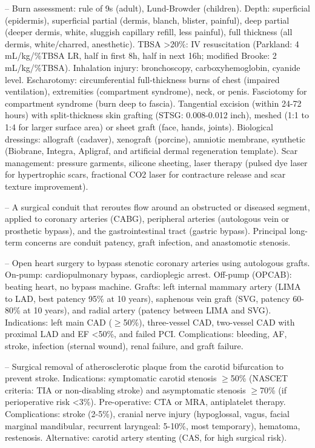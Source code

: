 -- Burn assessment: rule of 9s (adult), Lund-Browder (children). Depth: superficial (epidermis), superficial partial (dermis, blanch, blister, painful), deep partial (deeper dermis, white, sluggish capillary refill, less painful), full thickness (all dermis, white/charred, anesthetic). TBSA >20\%: IV resuscitation (Parkland: 4 mL/kg/\%TBSA LR, half in first 8h, half in next 16h; modified Brooke: 2 mL/kg/\%TBSA). Inhalation injury: bronchoscopy, carboxyhemoglobin, cyanide level. Escharotomy: circumferential full-thickness burns of chest (impaired ventilation), extremities (compartment syndrome), neck, or penis. Fasciotomy for compartment syndrome (burn deep to fascia). Tangential excision (within 24-72 hours) with split-thickness skin grafting (STSG: 0.008-0.012 inch), meshed (1:1 to 1:4 for larger surface area) or sheet graft (face, hands, joints). Biological dressings: allograft (cadaver), xenograft (porcine), amniotic membrane, synthetic (Biobrane, Integra, Apligraf, and artificial dermal regeneration template). Scar management: pressure garments, silicone sheeting, laser therapy (pulsed dye laser for hypertrophic scars, fractional CO2 laser for contracture release and scar texture improvement).

-- A surgical conduit that reroutes flow around an obstructed or diseased segment, applied to coronary arteries (CABG), peripheral arteries (autologous vein or prosthetic bypass), and the gastrointestinal tract (gastric bypass). Principal long-term concerns are conduit patency, graft infection, and anastomotic stenosis.

-- Open heart surgery to bypass stenotic coronary arteries using autologous grafts. On-pump: cardiopulmonary bypass, cardioplegic arrest. Off-pump (OPCAB): beating heart, no bypass machine. Grafts: left internal mammary artery (LIMA to LAD, best patency 95\% at 10 years), saphenous vein graft (SVG, patency 60-80\% at 10 years), and radial artery (patency between LIMA and SVG). Indications: left main CAD (\(\ge\)50\%), three-vessel CAD, two-vessel CAD with proximal LAD and EF <50\%, and failed PCI. Complications: bleeding, AF, stroke, infection (sternal wound), renal failure, and graft failure.

-- Surgical removal of atherosclerotic plaque from the carotid bifurcation to prevent stroke. Indications: symptomatic carotid stenosis \(\ge\)50\% (NASCET criteria: TIA or non-disabling stroke) and asymptomatic stenosis \(\ge\)70\% (if perioperative risk <3\%). Pre-operative: CTA or MRA, antiplatelet therapy. Complications: stroke (2-5\%), cranial nerve injury (hypoglossal, vagus, facial marginal mandibular, recurrent laryngeal: 5-10\%, most temporary), hematoma, restenosis. Alternative: carotid artery stenting (CAS, for high surgical risk).

